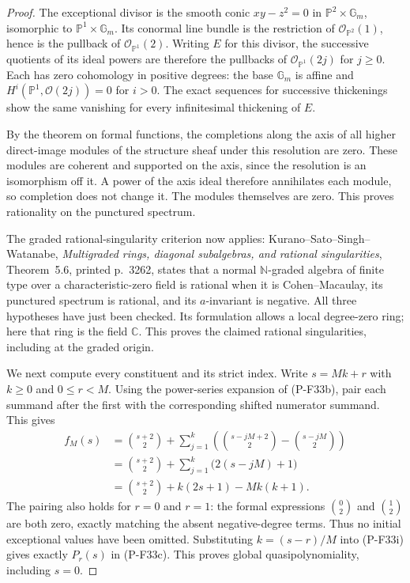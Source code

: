 \documentclass[11pt,a4paper]{article}
\begin{document}
\begin{proof}
The exceptional divisor is the smooth conic
$xy-z^2=0$ in $\mathbb P^2\times\mathbb G_m$,
isomorphic to $\mathbb P^1\times\mathbb G_m$.
Its conormal line bundle is the restriction of
$\mathcal O_{\mathbb P^2}(1)$, hence is
the pullback of $\mathcal O_{\mathbb P^1}(2)$.
Writing $E$ for this divisor, the successive
quotients of its ideal powers are therefore
the pullbacks of $\mathcal O_{\mathbb P^1}(2j)$
for $j\ge0$.
Each has zero cohomology in positive degrees:
the base $\mathbb G_m$ is affine and
$H^i(\mathbb P^1,\mathcal O(2j))=0$ for $i>0$.
The exact sequences for successive thickenings
show the same vanishing for every infinitesimal
thickening of $E$.

By the theorem on formal functions, the completions
along the axis of all higher direct-image modules
of the structure sheaf under this resolution are
zero. These modules are coherent and supported on
the axis, since the resolution is an isomorphism
off it. A power of the axis ideal therefore
annihilates each module, so completion does not
change it. The modules themselves are zero.
This proves rationality on the punctured spectrum.

The graded rational-singularity criterion now applies:
Kurano--Sato--Singh--Watanabe,
\emph{Multigraded rings, diagonal subalgebras, and
rational singularities}, Theorem~5.6, printed p.~3262,
states that a normal $\mathbb N$-graded algebra of
finite type over a characteristic-zero field is
rational when it is Cohen--Macaulay, its punctured
spectrum is rational, and its $a$-invariant is negative.
All three hypotheses have just been checked.
Its formulation allows a local degree-zero ring;
here that ring is the field $\mathbb C$.
This proves the claimed rational singularities,
including at the graded origin.

We next compute every constituent and its strict index.
Write $s=Mk+r$ with $k\ge0$ and $0\le r<M$.
Using the power-series expansion of (P-F33b),
pair each summand after the first with the
corresponding shifted numerator summand. This gives
\begin{align*}
 f_M(s)
 &=\binom{s+2}{2}
      +\sum_{j=1}^{k}
           \left(\binom{s-jM+2}{2}
                        -\binom{s-jM}{2}\right)\\
 &=\binom{s+2}{2}
      +\sum_{j=1}^{k}\bigl(2(s-jM)+1\bigr)\\
 &=\binom{s+2}{2}+k(2s+1)-Mk(k+1).
 \tag{P-F33i}
\end{align*}
The pairing also holds for $r=0$ and $r=1$:
the formal expressions $\binom02$ and $\binom12$
are both zero, exactly matching the absent
negative-degree terms. Thus no initial exceptional
values have been omitted.
Substituting $k=(s-r)/M$ into (P-F33i) gives
exactly $P_r(s)$ in (P-F33c).
This proves global quasipolynomiality, including $s=0$.


\end{proof}
\end{document}
